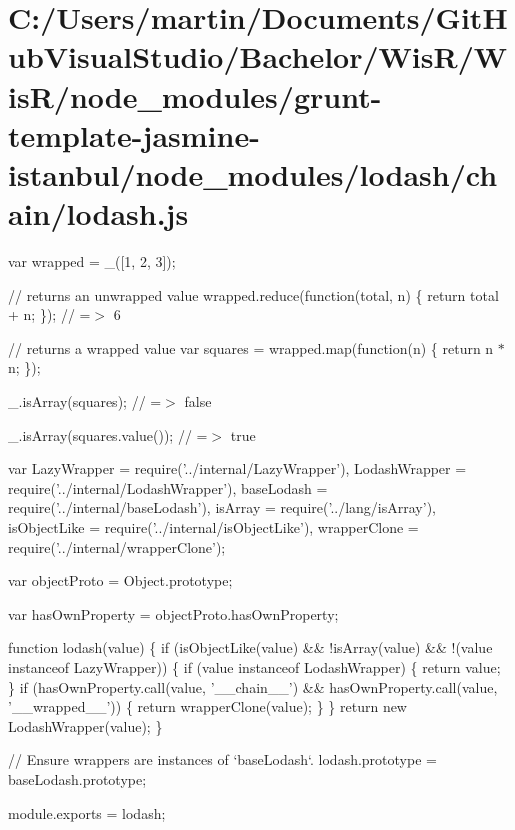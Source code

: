 \hypertarget{_c_1_2_users_2martin_2_documents_2_git_hub_visual_studio_2_bachelor_2_wis_r_2_wis_r_2node_moduleea2ca8f6e294c2cc90bf5b12039478ee}{}\section{C\+:/\+Users/martin/\+Documents/\+Git\+Hub\+Visual\+Studio/\+Bachelor/\+Wis\+R/\+Wis\+R/node\+\_\+modules/grunt-\/template-\/jasmine-\/istanbul/node\+\_\+modules/lodash/chain/lodash.\+js}
var wrapped = \+\_\+(\mbox{[}1, 2, 3\mbox{]});

// returns an unwrapped value wrapped.\+reduce(function(total, n) \{ return total + n; \}); // =$>$ 6

// returns a wrapped value var squares = wrapped.\+map(function(n) \{ return n $\ast$ n; \});

\+\_\+.\+is\+Array(squares); // =$>$ false

\+\_\+.\+is\+Array(squares.\+value()); // =$>$ true


\begin{DoxyCodeInclude}
var LazyWrapper = require(\textcolor{stringliteral}{'../internal/LazyWrapper'}),
    LodashWrapper = require(\textcolor{stringliteral}{'../internal/LodashWrapper'}),
    baseLodash = require(\textcolor{stringliteral}{'../internal/baseLodash'}),
    isArray = require(\textcolor{stringliteral}{'../lang/isArray'}),
    isObjectLike = require(\textcolor{stringliteral}{'../internal/isObjectLike'}),
    wrapperClone = require(\textcolor{stringliteral}{'../internal/wrapperClone'});

var objectProto = Object.prototype;

var hasOwnProperty = objectProto.hasOwnProperty;

\textcolor{keyword}{function} lodash(value) \{
  \textcolor{keywordflow}{if} (isObjectLike(value) && !isArray(value) && !(value instanceof LazyWrapper)) \{
    \textcolor{keywordflow}{if} (value instanceof LodashWrapper) \{
      \textcolor{keywordflow}{return} value;
    \}
    \textcolor{keywordflow}{if} (hasOwnProperty.call(value, \textcolor{stringliteral}{'\_\_chain\_\_'}) && hasOwnProperty.call(value, \textcolor{stringliteral}{'\_\_wrapped\_\_'})) \{
      \textcolor{keywordflow}{return} wrapperClone(value);
    \}
  \}
  \textcolor{keywordflow}{return} \textcolor{keyword}{new} LodashWrapper(value);
\}

\textcolor{comment}{// Ensure wrappers are instances of `baseLodash`.}
lodash.prototype = baseLodash.prototype;

module.exports = lodash;
\end{DoxyCodeInclude}
 